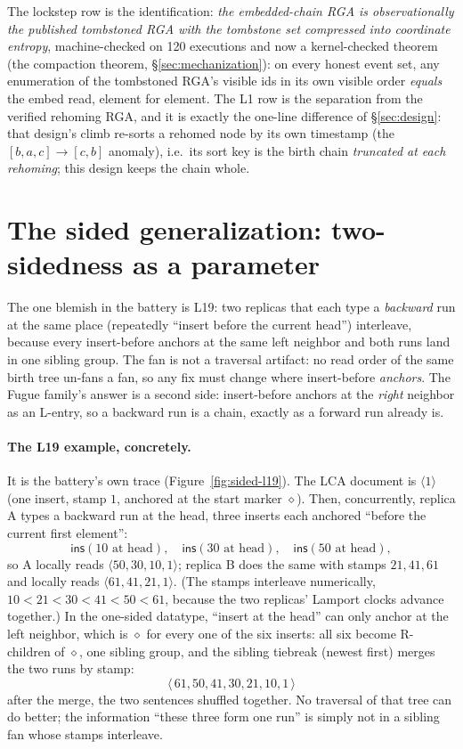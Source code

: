 \documentclass[11pt]{article}
\newcommand{\ins}{\mathsf{ins}}
\begin{document}
\noindent The lockstep row is the identification: \emph{the
embedded-chain RGA is observationally the published tombstoned RGA
with the tombstone set compressed into coordinate entropy},
machine-checked on 120 executions and now a kernel-checked theorem
(the compaction theorem, \S\ref{sec:mechanization}): on every honest
event set, any enumeration of the tombstoned RGA's visible ids in its
own visible order \emph{equals} the embed read, element for element. The L1 row is the separation
from the verified rehoming RGA, and it is
exactly the one-line difference of \S\ref{sec:design}: that design's
climb re-sorts a rehomed node by its own timestamp (the
$[b,a,c] \to [c,b]$ anomaly), i.e.\ its sort key is the birth chain
\emph{truncated at each rehoming}; this design keeps the chain whole.

\section{The sided generalization: two-sidedness as a parameter}
\label{sec:sided}

The one blemish in the battery is L19: two replicas that each type a
\emph{backward} run at the same place (repeatedly ``insert before the
current head'') interleave, because every insert-before anchors at the
same left neighbor and both runs land in one sibling group. The fan is
not a traversal artifact: no read order of the same birth tree un-fans
a fan, so any fix must change where insert-before \emph{anchors}. The
Fugue family's answer is a second side: insert-before anchors at the
\emph{right} neighbor as an L-entry, so a backward run is a chain,
exactly as a forward run already is.

\paragraph{The L19 example, concretely.} It is the battery's own trace
(Figure~\ref{fig:sided-l19}). The LCA document is $\langle 1 \rangle$
(one insert, stamp $1$, anchored at the start marker $\diamond$). Then,
concurrently, replica A types a backward run at the head, three
inserts each anchored ``before the current first element'':
\[
  \ins(10 \text{ at head}),\quad \ins(30 \text{ at head}),\quad
  \ins(50 \text{ at head}),
\]
so A locally reads $\langle 50, 30, 10, 1 \rangle$; replica B does the
same with stamps $21, 41, 61$ and locally reads
$\langle 61, 41, 21, 1 \rangle$. (The stamps interleave numerically,
$10 < 21 < 30 < 41 < 50 < 61$, because the two replicas' Lamport
clocks advance together.) In the one-sided datatype, ``insert at the
head'' can only anchor at the left neighbor, which is $\diamond$ for
every one of the six inserts: all six become R-children of $\diamond$,
one sibling group, and the sibling tiebreak (newest first) merges the
two runs by stamp:
\[
  \langle\, 61, 50, 41, 30, 21, 10, 1 \,\rangle
\]
after the merge, the two sentences shuffled together. No traversal of
that tree can do better; the information ``these three form one run''
is simply not in a sibling fan whose stamps interleave.
\end{document}
